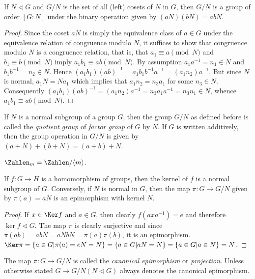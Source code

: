 \begin{Theorem}
	If $ N \vartriangleleft G $ and $ G/N $ is the set of all (left) cosets of $ N $ in $ G $, then $ G / N $ is a group of order $ [G:N] $ under the binary operation given by $ (aN)(bN)=abN $.
\end{Theorem}
\begin{proof}
	Since the coset $ aN $ is simply the equivalence class of $ a \in G $ under the equivalence relation of congruence modulo $ N $, it suffices to show that congruence modulo $ N $ is a congruence relation, that is, that $ a_1 \equiv a \pmod{N} $ and $ b_1 \equiv b \pmod{N} $ imply $ a_1 b_1 \equiv ab \pmod{N} $. By assumption $ a_1 a^{-1}=n_1 \in N $ and $ b_1 b^{-1}=n_2 \in N $. Hence $ (a_1 b_1)(ab)^{-1} =a_1 b_1 b^{-1}a^{-1}=(a_1 n_2)a^{-1}$. But since $ N $ is normal, $ a_1N = Na_1 $ which implies that $ a_1 n_2 = n_3 a_1$ for some $ n_3 \in N $. Consequently $ (a_1 b_1)(ab)^{-1} = (a_1 n_2)a^{-1}=n_3 a_1 a^{-1} = n_3 n_1 \in N $, whence $ a_1 b_1 \equiv ab \pmod{N} $.
\end{proof}
\begin{Definition}
	If $ N $ is a normal subgroup of a group $ G $, then the group $ G/N $ as defined before is called the \textit{quotient group} of \textit{factor group} of $ G $ by $ N $. If $ G $ is written additively, then the group operation in $ G /N $ is given by $ (a+N)+(b+N)=(a+b)+N $.
\end{Definition}
\begin{Example}
	$ \Zahlen_m = \Zahlen / \langle m \rangle $.
\end{Example}
\begin{Theorem}
	If $ f:G \to H $ is a homomorphism of groups, then the kernel of $ f $ is a normal subgroup of $ G $. Conversely, if $ N $ is normal in $ G $, then the map $ \pi:G \to G/N $ given by $ \pi(a)=aN $ is an epimorphism with kernel $ N $.
\end{Theorem}
\begin{proof}
	If $ x \in \Ker f $ and $ a \in G $, then clearly $ f(axa^{-1})=e $ and therefore $ \ker f \vartriangleleft G $. The map $ \pi $ is clearly surjective and since $ \pi(ab)=ab N = aNbN = \pi(a)\pi(b) $, it is an epimorphism. $ \Ker \pi = \{a \in G |\pi(a)=eN=N \}=\{a\in G |aN = N \}=\{a \in G| a \in N \}=N $.
\end{proof}
\begin{Definition}
	The map $ \pi:G \to G/N $ is called the \textit{canonical epimorphism} or \textit{projection}. Unless otherwise stated $ G \to G/N(N \vartriangleleft G) $ always denotes the canonical epimorphism.
\end{Definition}
